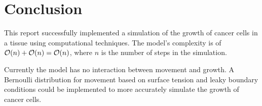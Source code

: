 \chapter{Conclusion}

This report successfully implemented a simulation of the growth of cancer cells in a tissue using computational techniques.
The model's complexity is of $\mathcal{O}(n) + \mathcal{O}(n) = \mathcal{O}(n)$, where $n$ is the number of steps in the simulation.


Currently the model has no interaction between movement and growth.
A Bernoulli distribution for movement based on surface tension and leaky boundary conditions could be implemented to more accurately simulate the growth of cancer cells.

